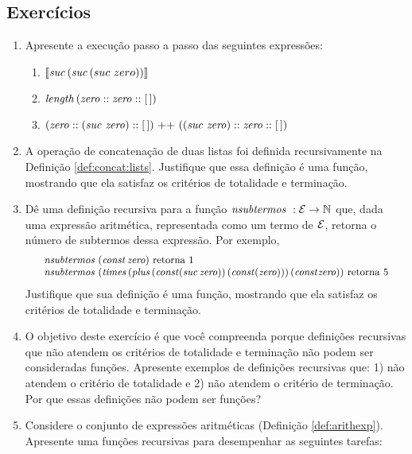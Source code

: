 \subsection{Exerc\'icios}

\begin{enumerate}
  \item Apresente a execu\c{c}\~ao passo a passo das seguintes express\~oes:
  \begin{enumerate}
    \item $\llbracket \textit{suc\/}\, (\textit{suc\/}\, (suc\,\,zero))\rrbracket$
    \item $\textit{length\/}\, (\textit{zero\/} :: \textit{zero\/} :: [\,])$
    \item $(\textit{zero\/} :: (\textit{suc\/}\,\, \textit{zero\/}) ::[\,])\text{ ++ }((\textit{suc\/}\,\,\textit{zero\/}) :: \textit{zero\/} :: [\,])$
  \end{enumerate}
  \item A operação de concatenação de duas listas foi definida recursivamente na Definição \ref{def:concat:lists}. Justifique que essa definição é uma fun\c{c}\~ao, mostrando que ela satisfaz  os critérios de totalidade e termina\c{c}\~ao.
  \item Dê uma defini\c{c}\~ao recursiva para a função $\textit{nsubtermos }: \mathcal{E} \rightarrow \mathbb{N}$ que, dada uma express\~ao aritm\'etica, representada como um termo de $\mathcal{E}$, retorna o número de subtermos dessa expressão. Por exemplo, 
 \[ \small{
\begin{array}{l}
 \textit{nsubtermos } (\textit{const\/}\, \textit{zero\/}) \text{ retorna 1} \\
 \textit{nsubtermos } (\textit{times\/}\,(\textit{plus\/}\,(\textit{const\/}(\textit{suc\/}\,\textit{zero\/}))\, (\textit{const\/}(\textit{zero\/})))\, (\textit{const\/}\textit{zero\/})) \text{ retorna 5} 
 \end{array} }
 \]
Justifique que sua definição é uma função, mostrando que ela satisfaz os critérios de totalidade e termina\c{c}\~ao.
  \item O objetivo deste exerc\'icio \'e que você compreenda porque defini\c{c}\~oes recursivas que n\~ao atendem os crit\'erios de totalidade e termina\c{c}\~ao n\~ao podem ser consideradas fun\c{c}\~oes.
        Apresente exemplos de defini\c{c}\~oes recursivas que: 1) n\~ao atendem o crit\'erio de totalidade e 2) n\~ao atendem o crit\'erio de termina\c{c}\~ao. Por que essas definições n\~ao podem ser fun\c{c}\~oes?
  \item Considere o conjunto de expressões aritméticas (Definição \ref{def:arithexp}). Apresente uma funções recursivas para desempenhar as seguintes tarefas:
  \begin{enumerate}

\end{enumerate}
\end{enumerate}
